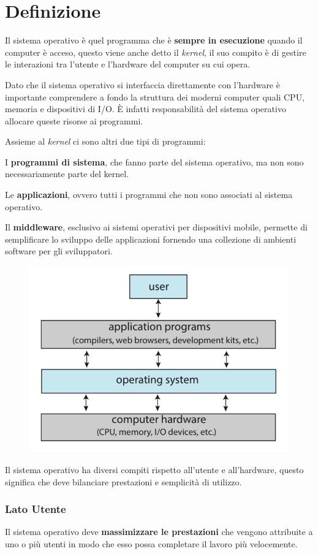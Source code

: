 \section{Definizione}

Il sistema operativo è quel programma che è \textbf{sempre in esecuzione} quando il computer è acceso, questo viene anche detto il \textit{kernel}, il suo compito è di gestire le interazioni tra l'utente e l'hardware del computer su cui opera.

\spacer
Dato che il sistema operativo si interfaccia direttamente con l'hardware è importante comprendere a fondo la struttura dei moderni computer quali CPU, memoria e dispositivi di I/O. È infatti responsabilità del sistema operativo allocare queste risorse ai programmi.

\spacer
Assieme al \textit{kernel} ci sono altri due tipi di programmi:
\begin{sitemize}
    \item I \textbf{programmi di sistema}, che fanno parte del sistema operativo, ma non sono necessariamente parte del kernel.
    \item Le \textbf{applicazioni}, ovvero tutti i programmi che non sono associati al sistema operativo.
    \item Il \textbf{middleware}, esclusivo ai sistemi operativi per dispositivi mobile, permette di semplificare lo sviluppo delle applicazioni fornendo una collezione di ambienti software per gli sviluppatori.
\end{sitemize}

\begin{figure}[H]
    \centering
    \includegraphics[width=0.45\linewidth]{assets/image.png}
\end{figure}

Il sistema operativo ha diversi compiti rispetto all'utente e all'hardware, questo significa che deve bilanciare prestazioni e semplicità di utilizzo.

\subsubsection*{Lato Utente}
Il sistema operativo deve \textbf{massimizzare le prestazioni} che vengono attribuite a uno o più utenti in modo che esso possa completare il lavoro più velocemente.

